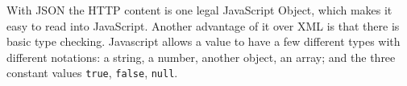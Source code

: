 With JSON the HTTP content is one legal JavaScript Object, which makes it easy to read into JavaScript. Another advantage of it over XML is that there is basic type checking. Javascript allows a value to have a few different types with different notations: a string, a number, another object, an array; and the three constant values \texttt{true}, \texttt{false}, \texttt{null}.
